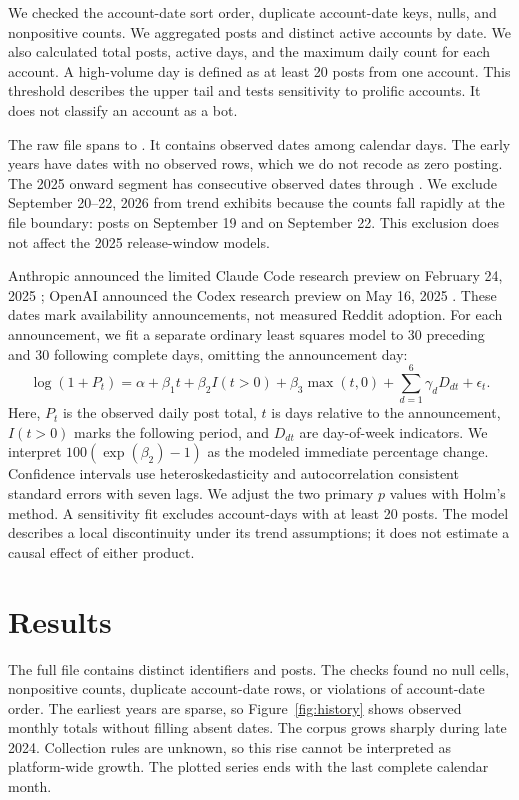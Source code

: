 \documentclass[11pt]{article}
\begin{document}
We checked the account-date sort order, duplicate account-date keys, nulls, and nonpositive counts. We aggregated posts and distinct active accounts by date. We also calculated total posts, active days, and the maximum daily count for each account. A high-volume day is defined as at least 20 posts from one account. This threshold describes the upper tail and tests sensitivity to prolific accounts. It does not classify an account as a bot.

The raw file spans \dataFirstDate{} to \dataLastRawDate{}. It contains \dataObservedDates{} observed dates among \dataCalendarDays{} calendar days. The early years have dates with no observed rows, which we do not recode as zero posting. The 2025 onward segment has \dataRecentDates{} consecutive observed dates through \dataAnalysisEnd{}. We exclude September 20--22, 2026 from trend exhibits because the counts fall rapidly at the file boundary: \dataLastStablePosts{} posts on September 19 and \dataLastDayPosts{} on September 22. This exclusion does not affect the 2025 release-window models.

Anthropic announced the limited Claude Code research preview on February 24, 2025 \cite{anthropic2025}; OpenAI announced the Codex research preview on May 16, 2025 \cite{openai2025}. These dates mark availability announcements, not measured Reddit adoption. For each announcement, we fit a separate ordinary least squares model to 30 preceding and 30 following complete days, omitting the announcement day:
\[
\log(1+P_t)=\alpha+\beta_1 t+\beta_2 I(t>0)+\beta_3\max(t,0)+\sum_{d=1}^{6}\gamma_d D_{dt}+\epsilon_t.
\]
Here, $P_t$ is the observed daily post total, $t$ is days relative to the announcement, $I(t>0)$ marks the following period, and $D_{dt}$ are day-of-week indicators. We interpret $100(\exp(\beta_2)-1)$ as the modeled immediate percentage change. Confidence intervals use heteroskedasticity and autocorrelation consistent standard errors with seven lags. We adjust the two primary $p$ values with Holm's method. A sensitivity fit excludes account-days with at least 20 posts. The model describes a local discontinuity under its trend assumptions; it does not estimate a causal effect of either product.

\section{Results}
The full file contains \dataAccounts{} distinct identifiers and \dataPosts{} posts. The checks found no null cells, nonpositive counts, duplicate account-date rows, or violations of account-date order. The earliest years are sparse, so Figure~\ref{fig:history} shows observed monthly totals without filling absent dates. The corpus grows sharply during late 2024. Collection rules are unknown, so this rise cannot be interpreted as platform-wide growth. The plotted series ends with the last complete calendar month.
\end{document}
